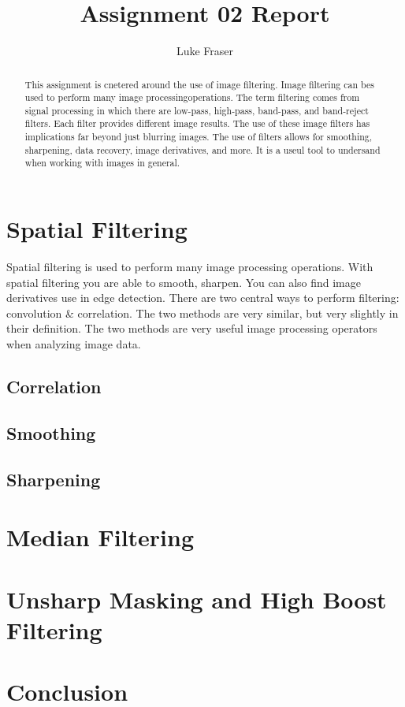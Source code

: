 \documentclass[letterpaper,10pt]{article}
\title{Assignment 02 Report}
\author{Luke Fraser}
\begin{document}
\maketitle

\begin{abstract}
This assignment is cnetered around the use of image filtering. Image filtering can bes used to perform many image processingoperations. The term filtering comes from signal processing in which there are low-pass, high-pass, band-pass, and band-reject filters. Each filter provides different image results. The use of these image filters has implications far beyond just blurring images. The use of filters allows for smoothing, sharpening, data recovery, image derivatives, and more. It is a useul tool to undersand when working with images in general.
\end{abstract}

\section{Spatial Filtering}
Spatial filtering is used to perform many image processing operations. With spatial filtering you are able to smooth, sharpen. You can also find image derivatives use in edge detection. There are two central ways to perform filtering: convolution \& correlation. The two methods are very similar, but very slightly in their definition. The two methods are very useful image processing operators when analyzing image data.

\subsection{Correlation}
\subsection{Smoothing}
\subsection{Sharpening}

\section{Median Filtering}
\section{Unsharp Masking and High Boost Filtering}

\section{Conclusion}
\end{document}
